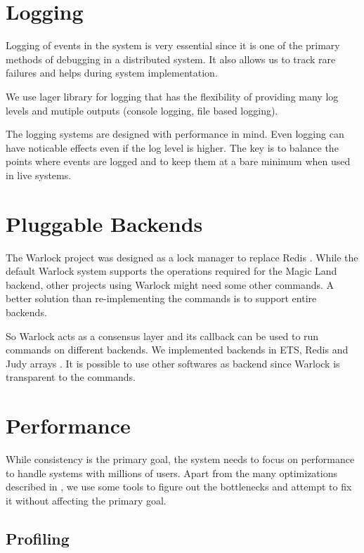 \section{Logging}

Logging of events in the system is very essential since it is one of the primary
methods of debugging in a distributed system. It also allows us to track rare
failures and helps during system implementation.

We use lager \citep{lager} library for logging that has the flexibility of
providing many log levels%
and mutiple outputs (console logging, file based logging).

The logging systems are designed with performance in mind. Even logging can have
noticable effects even if the log level is higher. The key is to balance the
points where events are logged and to keep them at a bare minimum when used in
live systems.

\section{Pluggable Backends}

The Warlock project was designed as a lock manager to replace Redis
\citep{redis}. While the default Warlock system supports the operations
required for the Magic Land backend, other projects using Warlock might need
some other commands. A better solution than re-implementing the commands is to
support entire backends.

So Warlock acts as a consensus layer and its callback can be used to run
commands on different backends. We implemented backends in ETS, Redis and
Judy arrays \citep{judy}. It is possible to use other softwares as backend
since Warlock is transparent to the commands.

\section{Performance}

While consistency is the primary goal, the system needs to focus on performance
to handle systems with millions of users. Apart from the many optimizations
described in , we use some tools to figure out
the bottlenecks and attempt to fix it without affecting the primary goal.

\subsection{Profiling}

